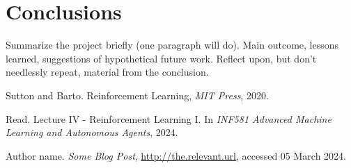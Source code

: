 \documentclass[../CSC_52081_EP.tex]{subfiles}
\begin{document}
    \section{Conclusions}
        Summarize the project briefly (one paragraph will do). Main outcome, lessons learned, suggestions of hypothetical future work. 
        Reflect upon, but don't needlessly repeat, material from the conclusion. 

    \begin{thebibliography}{4}

        Sutton and Barto. Reinforcement Learning,
        {\em MIT Press}, 2020.

            Read. Lecture IV - Reinforcement Learning I. In \textit{INF581 Advanced Machine Learning and Autonomous Agents}, 2024.

            Author name. \textit{Some Blog Post}, \url{http://the.relevant.url}, accessed 05 March 2024.
    \end{thebibliography}
\end{document}
